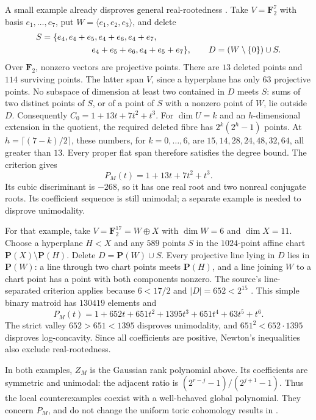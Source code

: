 A small example already disproves general real-rootedness
\cite[Appendix, Theorem~A.4]{ChengLiu26MatroidKL}.
Take $V=\mathbf F_2^7$ with basis $e_1,\ldots,e_7$, put
$W=\langle e_1,e_2,e_3\rangle$, and delete
\[
 \begin{split}
 S={}&\{e_4,e_4+e_5,e_4+e_6,e_4+e_7,\\
     &\hspace{16mm}e_4+e_5+e_6,e_4+e_5+e_7\},\qquad
 D=(W\setminus\{0\})\cup S.
 \end{split}
\]
Over $\mathbf F_2$, nonzero vectors are projective points.
There are $13$ deleted points and $114$ surviving points. The
latter span $V$, since a hyperplane has only $63$ projective
points. No subspace of dimension at least two contained in $D$
meets $S$: sums of two distinct points of $S$, or of a point of
$S$ with a nonzero point of $W$, lie outside $D$.
Consequently $C_0=1+13t+7t^2+t^3$.
For $\dim U=k$ and an $h$-dimensional extension in the quotient,
the required deleted fibre has $2^k(2^h-1)$ points. At
$h=\lceil(7-k)/2\rceil$, these numbers, for $k=0,\ldots,6$,
are $15,14,28,24,48,32,64$, all greater than $13$.
Every proper flat span therefore satisfies the degree bound.
The criterion gives
\[
 P_M(t)=1+13t+7t^2+t^3.
\]
Its cubic discriminant is $-268$, so it has one real root and
two nonreal conjugate roots. Its coefficient sequence is still
unimodal; a separate example is needed to disprove unimodality.

For that example, take $V=\mathbf F_2^{17}=W\oplus X$ with
$\dim W=6$ and $\dim X=11$. Choose a hyperplane $H<X$ and
any $589$ points $S$ in the $1024$-point affine chart
$\mathbf P(X)\setminus\mathbf P(H)$. Delete
$D=\mathbf P(W)\cup S$. Every projective line lying in $D$
lies in $\mathbf P(W)$: a line through two chart points meets
$\mathbf P(H)$, and a line joining $W$ to a chart point has a
point with both components nonzero. The source's line-separated
criterion applies because $6<17/2$ and $|D|=652<2^{15}$
\cite[Proposition~2.6 and Corollaries~1.2--1.3]
{ChengLiu26MatroidKL}. This simple binary matroid has $130419$
elements and
\[
 P_M(t)=1+652t+651t^2+1395t^3+651t^4+63t^5+t^6.
\]
The strict valley $652>651<1395$ disproves unimodality, and
$651^2<652\cdot1395$ disproves log-concavity. Since all
coefficients are positive, Newton's inequalities also exclude
real-rootedness.

In both examples, $Z_M$ is the Gaussian rank polynomial above.
Its coefficients are symmetric and unimodal: the adjacent ratio
is $(2^{r-j}-1)/(2^{j+1}-1)$. Thus the local counterexamples
coexist with a well-behaved global polynomial. They concern
$P_M$, and do not change the uniform toric cohomology results in
.

